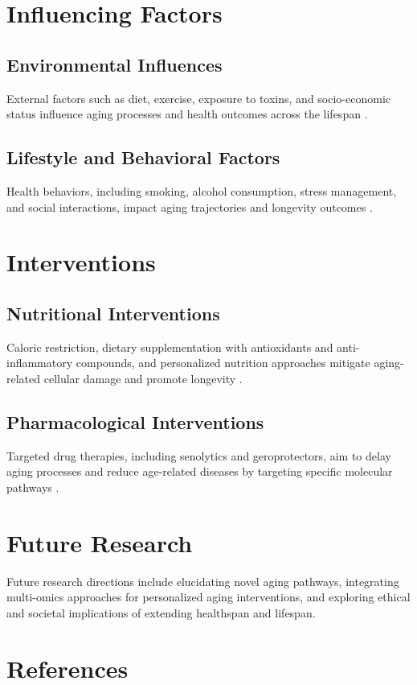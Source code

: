 \documentclass[12pt]{article}
\begin{document}
\section{Influencing Factors}
\subsection{Environmental Influences}
External factors such as diet, exercise, exposure to toxins, and socio-economic status influence aging processes and health outcomes across the lifespan \citep{kirkland2017aging, franceschi2018inflammaging}.

\subsection{Lifestyle and Behavioral Factors}
Health behaviors, including smoking, alcohol consumption, stress management, and social interactions, impact aging trajectories and longevity outcomes \citep{willcox2007healthy, stewart2018stress}.

\section{Interventions}
\subsection{Nutritional Interventions}
Caloric restriction, dietary supplementation with antioxidants and anti-inflammatory compounds, and personalized nutrition approaches mitigate aging-related cellular damage and promote longevity \citep{mattson2014nutritional, fontana2014longevity}.

\subsection{Pharmacological Interventions}
Targeted drug therapies, including senolytics and geroprotectors, aim to delay aging processes and reduce age-related diseases by targeting specific molecular pathways \citep{kirkland2015senolytics, kennedy2016geroscience}.

\section{Future Research}
Future research directions include elucidating novel aging pathways, integrating multi-omics approaches for personalized aging interventions, and exploring ethical and societal implications of extending healthspan and lifespan.

\section*{References}


\end{document}
